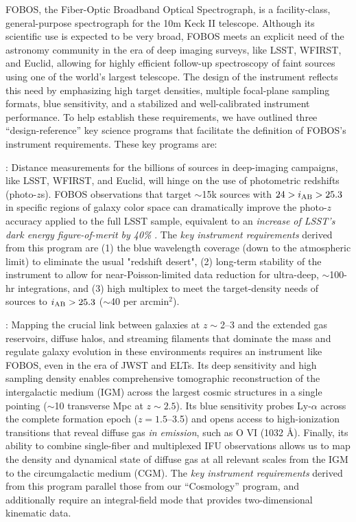 \documentclass[oneside,11pt]{amsart}
\begin{document}
FOBOS, the Fiber-Optic Broadband Optical Spectrograph, is a
facility-class, general-purpose spectrograph for the 10m Keck II
telescope. Although its scientific use is expected to be very broad,
FOBOS meets an explicit need of the astronomy community in the era of
deep imaging surveys, like LSST, WFIRST, and Euclid, allowing for
highly efficient follow-up spectroscopy of faint sources using one of
the world's largest telescope. The design of the instrument reflects
this need by emphasizing high target densities, multiple focal-plane
sampling formats, blue sensitivity, and a stabilized and
well-calibrated instrument performance. To help establish these
requirements, we have outlined three ``design-reference'' key science
programs that facilitate the definition of FOBOS's instrument
requirements. These key programs are:

\smallskip

: Distance measurements for the
billions of sources in deep-imaging campaigns, like LSST, WFIRST, and
Euclid, will hinge on the use of photometric redshifts (photo-$z$s).
FOBOS observations that target $\sim$15k sources with $24 > i_{\rm
AB} > 25.3$ in specific regions of galaxy color space
\citep[see][]{masters15, masters19} can dramatically improve the
photo-$z$ accuracy applied to the full LSST sample, equivalent to an
{\em increase of LSST's dark energy figure-of-merit by 40\%}
\citep{newman15}. The {\it key instrument requirements} derived from
this program are (1) the blue wavelength coverage (down to the
atmospheric limit) to eliminate the usual "redshift desert", (2)
long-term stability of the instrument to allow for
near-Poisson-limited data reduction for ultra-deep, $\sim$100-hr
integrations, and (3) high multiplex to meet the target-density needs
of sources to $i_{\rm AB} > 25.3$ ($\sim$40 per arcmin$^2$).

\smallskip

: Mapping the crucial link between galaxies at $z\sim$2--3 and
the extended gas reservoirs, diffuse halos, and streaming filaments
that dominate the mass and regulate galaxy evolution in these
environments requires an instrument like FOBOS, even in the era of
JWST and ELTs. Its deep sensitivity and high sampling density enables
comprehensive tomographic reconstruction of the intergalactic medium
(IGM) across the largest cosmic structures in a single pointing
($\sim$10 transverse Mpc at $z \sim 2.5$). Its blue sensitivity
probes Ly-$\alpha$ across the complete formation epoch ($z =
1.5$--3.5) and opens access to high-ionization transitions that
reveal diffuse gas \emph{in emission}, such as O VI (1032 \AA).
Finally, its ability to combine single-fiber and multiplexed IFU
observations allows us to map the density and dynamical state of
diffuse gas at all relevant scales from the IGM to the circumgalactic
medium (CGM). The {\it key instrument requirements} derived from this
program parallel those from our ``Cosmology'' program, and
additionally require an integral-field mode that provides
two-dimensional kinematic data.
\end{document}

